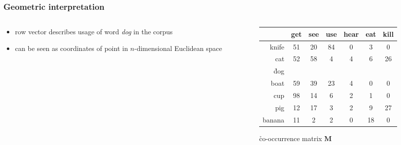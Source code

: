 \begin{frame}
  \frametitle{Geometric interpretation}

  \begin{columns}[T]
    \begin{column}{40mm}
      \begin{itemize}
      \item row vector  describes usage of word \emph{dog} in the corpus
      \item can be seen as coordinates of point in $n$-dimensional Euclidean space
       \end{itemize}
    \end{column}
    \begin{column}{75mm}      
      \gap[2]
      \begin{small}
        \setlength{\arrayrulewidth}{1pt}
        \begin{tabular}{r*{6}{|c}|}
          & get & see & use & hear & eat & kill \\
          \hline
          knife &  51 & 20 & 84 &  0 &  3 &  0 \\
          \hline
          cat  &  52 & 58 &  4 &  4 &  6 & 26 \\
          \hline
          \h{dog} &  &  &  &  &  &  \\
          \hline
          boat &  59 & 39 & 23 &  4 &  0 &  0 \\
          \hline
          cup  &  98 & 14 &  6 &  2 &  1 &  0 \\
          \hline
          pig  &  12 & 17 &  3 &  2 &  9 & 27 \\
          \hline
          banana & 11 &  2 &  2 &  0 & 18 &  0 \\
          \hline
        \end{tabular}
      \end{small}

      \begin{center}
        \h{co-occurrence matrix} $\mathbf{M}$
      \end{center}
    \end{column}
  \end{columns}
\end{frame}

